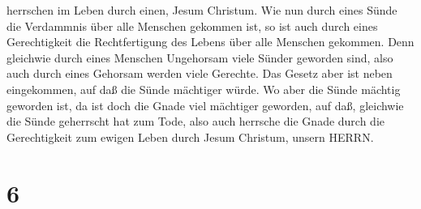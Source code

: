 herrschen im Leben durch einen, Jesum Christum.  Wie nun
durch eines Sünde die Verdammnis über alle Menschen gekommen ist, so ist
auch durch eines Gerechtigkeit die Rechtfertigung des Lebens über alle
Menschen gekommen.  Denn gleichwie durch eines Menschen
Ungehorsam viele Sünder geworden sind, also auch durch eines Gehorsam
werden viele Gerechte.  Das Gesetz aber ist neben
eingekommen, auf daß die Sünde mächtiger würde. Wo aber die Sünde
mächtig geworden ist, da ist doch die Gnade viel mächtiger geworden,
 auf daß, gleichwie die Sünde geherrscht hat zum Tode, also
auch herrsche die Gnade durch die Gerechtigkeit zum ewigen Leben durch
Jesum Christum, unsern HERRN.

\hypertarget{section-5}{%
\section{6}\label{section-5}}

